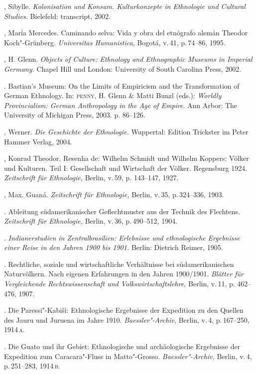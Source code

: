 \begin{bibliohedra}
 , Sibylle. \textit{Kolonisation und Konsum. Kulturkonzepte in
 Ethnologie und Cultural Studies.} Bielefeld: transcript, 2002.

 , María Mercedes. Caminando selva: Vida y obra del
 etnógrafo alemán Theodor Koch"-Grünberg. \textit{Universitas
 Humanistica}, Bogotá, v.\,41, p.\,74--86, 1995.

 , H. Glenn. \textit{Objects of Culture: Ethnology and Ethnographic
 Museums in Imperial Germany.} Chapel Hill und London: University of
 South Carolina Press, 2002.

 \titidem. Bastian's Museum: On the Limits of Empiricism and
 the Transformation of German Ethnology. In: \textsc{penny}, H. Glenn \& Matti
 Bunzl (eds.): \textit{Worldly Provincialism: German Anthropology in the
 Age of Empire}. Ann Arbor: The University of Michigan Press, 2003. p.
 86--126.

 , Werner. \textit{Die Geschichte der Ethnologie.} Wuppertal:
 Edition Trickster im Peter Hammer Verlag, 2004.

 , Konrad Theodor. Resenha de: Wilhelm Schmidt und Wilhelm Koppers:
 Völker und Kulturen. Teil I: Gesellschaft und Wirtschaft der Völker.
 Regensburg 1924. \textit{Zeitschrift für Ethnologie,} Berlin, v.\,59, p.
 143--147, 1927.

 , Max. Guaná. \textit{Zeitschrift für Ethnologie,} Berlin, v.\,35,
 p.\,324--336, 1903.

 \titidem. Ableitung südamerikanischer Geflechtmuster aus der
 Technik des Flechtens. \textit{Zeitschrift für Ethnologie,} Berlin, v.\,36, p.\,490--512, 1904.

 \titidem. \textit{Indianerstudien in Zentralbrasilien:
 Erlebnisse und ethnologische Ergebnisse einer Reise in den Jahren 1900
 bis 1901.} Berlin: Dietrich Reimer, 1905.

 \titidem. Rechtliche, soziale und wirtschaftliche
 Verhältnisse bei südamerikanischen Naturvölkern. Nach eigenen
 Erfahrungen in den Jahren 1900/1901. \textit{Blätter für Vergleichende
 Rechtswissenschaft und Volkswirtschaftslehre,} Berlin, v.\,11, p.
 462--476, 1907.

 \titidem. Die Paressi"-Kabiši: Ethnologische Ergebnisse der
 Expedition zu den Quellen des Jauru und Juruena im Jahre 1910.
 \textit{Baessler"-Archiv,} Berlin, v.\,4, p.\,167--250, 1914\,\textsc{a}.

 \titidem. Die Guato und ihr Gebiet: Ethnologische und
 archäologische Ergebnisse der Expedition zum Caracara"-Fluss in
 Matto"-Grosso. \textit{Baessler"-Archiv,} Berlin, v.\,4, p.\,251--283, 1914\,\textsc{b}.


\end{bibliohedra}

